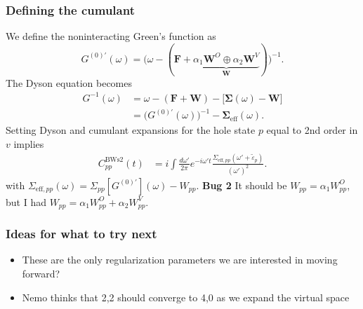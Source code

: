 \begin{frame}
    \frametitle{Defining the cumulant }
We define the noninteracting Green's function as
\begin{equation}
G^{(0)'}(\omega)
=
\big( \omega - (\mathbf{F} + \underbrace{\alpha_1 \mathbf{W}^O \oplus \alpha_2 \mathbf{W}^V}_{\mathbf{W}}) \big)^{-1}.
\end{equation}\pause
The Dyson equation becomes
\begin{align}
G^{-1}(\omega)
&= \omega - (\mathbf{F} + \mathbf{W})
   - \big[ \bm{\Sigma}(\omega) - \mathbf{W} \big] \\
&= \big( G^{(0)'}(\omega) \big)^{-1}
   - \bm{\Sigma}_{\mathrm{eff}}(\omega).
\end{align}\pause
Setting Dyson and cumulant expansions for the hole state $p$ equal to 2nd order in $v$
implies
\begin{align}
C_{pp}^{\mathrm{BWs2}}(t)
&=
i \int \frac{d\omega'}{2\pi}
e^{-i\omega' t}
\frac{\Sigma_{\mathrm{eff},pp}(\omega' + \tilde{\varepsilon}_p)}
     {(\omega')^2}. %
\end{align}\pause
with $\Sigma_{\mathrm{eff},pp}(\omega) = \Sigma_{pp}[G^{(0)'}](\omega) -W_{pp}$. \pause \textbf{Bug 2} It should be $W_{pp}=\alpha_1 W^{O}_{pp}$, but I had $W_{pp}=\alpha_1 W^{O}_{pp} + \alpha_2 W^{V}_{pp}$.
\end{frame}
\begin{frame}
    \frametitle{Ideas for what to try next }
\begin{itemize}
    \item These are the only regularization parameters we are interested in moving forward? \pause
    \item Nemo thinks that 2,2 should converge to 4,0 as we expand the virtual space \end{itemize}
\end{frame}
